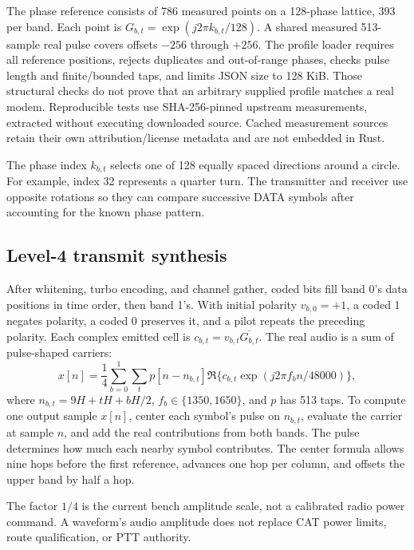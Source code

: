 The phase reference consists of 786 measured points on a 128-phase lattice,
393 per band. Each point is $G_{b,t}=\exp(j2\pi k_{b,t}/128)$. A shared measured
513-sample real pulse covers offsets $-256$ through $+256$. The profile loader
requires all reference positions, rejects duplicates and out-of-range phases,
checks pulse length and finite/bounded taps, and limits JSON size to 128 KiB.
Those structural checks do not prove that an arbitrary supplied profile matches
a real modem. Reproducible tests use SHA-256-pinned upstream measurements,
extracted without executing downloaded source. Cached measurement sources
retain their own attribution/license metadata and are not embedded in Rust.

The phase index $k_{b,t}$ selects one of 128 equally spaced directions
around a circle. For example, index 32 represents a quarter turn. The
transmitter and receiver use opposite rotations so they can compare
successive DATA symbols after accounting for the known phase pattern.


\subsection{Level-4 transmit synthesis}
After whitening, turbo encoding, and channel gather, coded bits fill band 0's
data positions in time order, then band 1's. With initial polarity
$v_{b,0}=+1$, a coded 1 negates polarity, a coded 0 preserves it, and a pilot
repeats the preceding polarity. Each complex emitted cell is
$c_{b,t}=v_{b,t}\overline{G_{b,t}}$. The real audio is a sum of pulse-shaped
carriers:
\[
 x[n]=\frac14\sum_{b=0}^{1}\sum_t p[n-n_{b,t}]
       \Re\{c_{b,t}\exp(j2\pi f_b n/48000)\},
\]
where $n_{b,t}=9H+tH+bH/2$, $f_b\in\{1350,1650\}$, and $p$ has 513 taps.
To compute one output sample $x[n]$, center each symbol's pulse on
$n_{b,t}$, evaluate the carrier at sample $n$, and add the real
contributions from both bands. The pulse determines how much each nearby
symbol contributes. The center formula allows nine hops before the
first reference, advances one hop per column, and offsets the upper
band by half a hop.

The factor $1/4$ is the current bench amplitude scale, not a calibrated radio
power command. A waveform's audio amplitude does not replace CAT power limits,
route qualification, or PTT authority.

